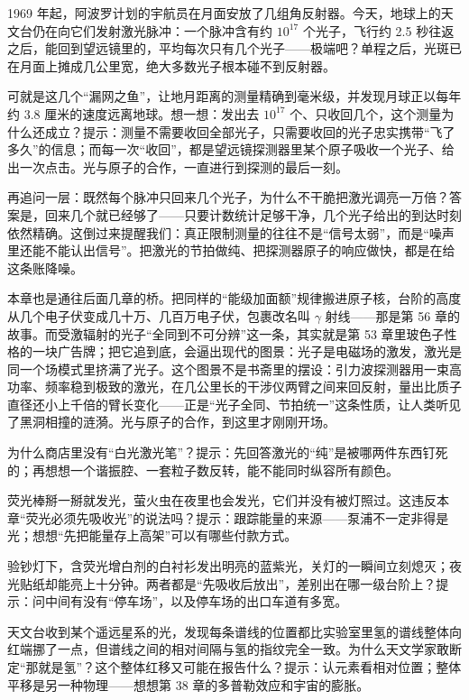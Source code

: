 \begin{thought}[月光下的几个光子]
1969 年起，阿波罗计划的宇航员在月面安放了几组角反射器。今天，地球上的天文台仍在向它们发射激光脉冲：一个脉冲含有约 \(10^{17}\) 个光子，飞行约 2.5 秒往返之后，能回到望远镜里的，平均每次只有几个光子——极端吧？单程之后，光斑已在月面上摊成几公里宽，绝大多数光子根本碰不到反射器。

可就是这几个“漏网之鱼”，让地月距离的测量精确到毫米级，并发现月球正以每年约 3.8 厘米的速度远离地球。想一想：发出去 \(10^{17}\) 个、只收回几个，这个测量为什么还成立？提示：测量不需要收回全部光子，只需要收回的光子忠实携带“飞了多久”的信息；而每一次“收回”，都是望远镜探测器里某个原子吸收一个光子、给出一次点击。光与原子的合作，一直进行到探测的最后一刻。

再追问一层：既然每个脉冲只回来几个光子，为什么不干脆把激光调亮一万倍？答案是，回来几个就已经够了——只要计数统计足够干净，几个光子给出的到达时刻依然精确。这倒过来提醒我们：真正限制测量的往往不是“信号太弱”，而是“噪声里还能不能认出信号”。把激光的节拍做纯、把探测器原子的响应做快，都是在给这条账降噪。
\end{thought}

\begin{mainline}
本章也是通往后面几章的桥。把同样的“能级加面额”规律搬进原子核，台阶的高度从几个电子伏变成几十万、几百万电子伏，包裹改名叫 \(\gamma\) 射线——那是第 56 章的故事。而受激辐射的光子“全同到不可分辨”这一条，其实就是第 53 章里玻色子性格的一块广告牌；把它追到底，会逼出现代的图景：光子是电磁场的激发，激光是同一个场模式里挤满了光子。这个图景不是书斋里的摆设：引力波探测器用一束高功率、频率稳到极致的激光，在几公里长的干涉仪两臂之间来回反射，量出比质子直径还小上千倍的臂长变化——正是“光子全同、节拍统一”这条性质，让人类听见了黑洞相撞的涟漪。光与原子的合作，到这里才刚刚开场。
\end{mainline}

\begin{puzzles}
\item 为什么商店里没有“白光激光笔”？提示：先回答激光的“纯”是被哪两件东西钉死的；再想想一个谐振腔、一套粒子数反转，能不能同时纵容所有颜色。
\item 荧光棒掰一掰就发光，萤火虫在夜里也会发光，它们并没有被灯照过。这违反本章“荧光必须先吸收光”的说法吗？提示：跟踪能量的来源——泵浦不一定非得是光；想想“先把能量存上高架”可以有哪些付款方式。
\item 验钞灯下，含荧光增白剂的白衬衫发出明亮的蓝紫光，关灯的一瞬间立刻熄灭；夜光贴纸却能亮上十分钟。两者都是“先吸收后放出”，差别出在哪一级台阶上？提示：问中间有没有“停车场”，以及停车场的出口车道有多宽。
\item 天文台收到某个遥远星系的光，发现每条谱线的位置都比实验室里氢的谱线整体向红端挪了一点，但谱线之间的相对间隔与氢的指纹完全一致。为什么天文学家敢断定“那就是氢”？这个整体红移又可能在报告什么？提示：认元素看相对位置；整体平移是另一种物理——想想第 38 章的多普勒效应和宇宙的膨胀。
\end{puzzles}
